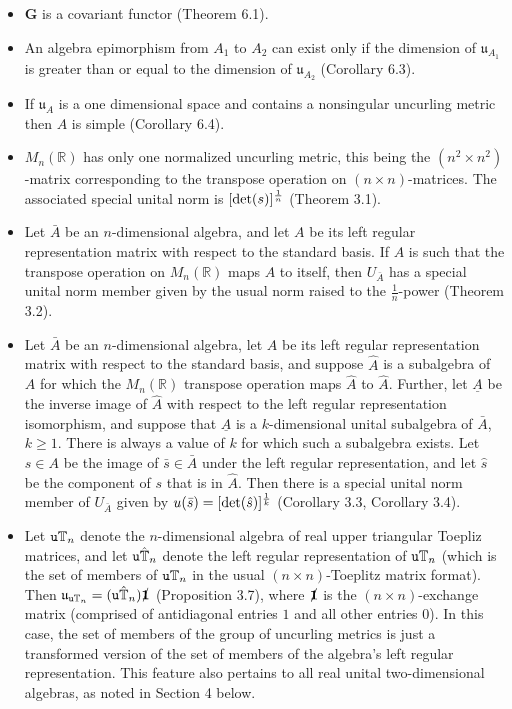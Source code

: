 \documentclass{amsart}
\numberwithin{equation}{section}
\theoremstyle{definition}
\numberwithin{theorem}{section}
\begin{document}
\begin{itemize} 
\item $\mathbf{G}$ is a covariant functor (Theorem 6.1).
\item An algebra epimorphism from $A_1$ to $A_2$ can exist only if the dimension of $\mathfrak{u}_{A_1}$ is greater than or equal to the dimension of $\mathfrak{u}_{A_2}$ (Corollary 6.3). 
\item If $\mathfrak{u}_A$ is a one dimensional space and contains a nonsingular uncurling metric then $A$ is simple (Corollary 6.4).
\item  $ M_n(\mathbb{R})$ has only one normalized uncurling metric, this being the $(n^2\times n^2)$-matrix corresponding to the  transpose operation on $(n\times n)$-matrices. The associated special unital norm is $[{\rm det}(s)]^{\frac{1}{n}}$ (Theorem 3.1). 
\item Let $\bar{A}$ be an $n$-dimensional algebra, and let $A$ be its left regular representation matrix with respect to the standard basis.  If $A$ is such that the transpose operation on $ M_n(\mathbb{R})$ maps $A$ to itself, then $ U_{\bar{A}}$ has a special unital norm member given by the usual norm raised to the $\frac{1}{n}$-power (Theorem 3.2).
\item Let $\bar{A}$ be an $n$-dimensional algebra, let $A$ be its left regular representation matrix with respect to the standard basis, and suppose $\hat{A}$ is a subalgebra of $A$ for which the $ M_n(\mathbb{R})$ transpose operation maps $\hat{A}$ to $\hat{A}$.  Further, let $\underline{A}$ be the inverse image of $\hat{A}$ with respect to the left regular representation isomorphism, and suppose that $\underline{A}$ is a $k$-dimensional unital subalgebra of $\bar{A}$, $k\ge 1$.  There is always a value of $k$ for which such a subalgebra exists.  Let $s\in A$ be the image of $\bar{s}\in \bar{A}$ under the left regular representation, and let $\hat{s}$ be the component of $s$ that is in $\hat{A}$.  Then there is a special unital norm member of $ U_{\bar{A}}$ given by $ u(\bar{s}) = [\text{\rm det}(\hat{s})]^{\frac{1}{k}}$ (Corollary 3.3, Corollary 3.4).
\item Let ${\tt u}\mathbb{T}_n$ denote the $n$-dimensional algebra of real upper triangular Toepliz matrices, and let ${\tt u}\hat{\mathbb{T}}_n$  denote the left regular representation of ${\tt u}\mathbb{T}_n$ (which is the set of members of ${\tt u}\mathbb{T}_n$ in the usual $(n\times n)$-Toeplitz matrix format).  Then $\mathfrak{u}_{{\tt u}\mathbb{T}_n} = ({\tt u}\hat{\mathbb{T}}_n)\slashed{\mathbf{1}}$ (Proposition 3.7), where $\slashed{\mathbf{1}}$ is the $(n\times n)$-exchange matrix (comprised of antidiagonal entries $1$ and all other entries $0$).  In this case, the set of members of the group of uncurling metrics is just a transformed version of the set of members of the algebra's left regular representation.  This feature also pertains to all real unital two-dimensional algebras, as noted in Section 4 below.

\end{itemize}
\end{document}
